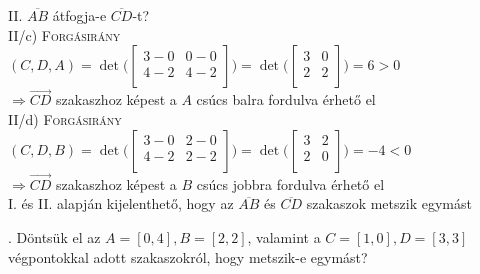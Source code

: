 \documentclass[12pt]{article}
\begin{document}
\noindent II. $\overline{AB}$ átfogja-e $\overline{CD}$-t? \\
II/c) {\scshape Forgásirány}$(C,D,A)=\det\Bigg(\begin{bmatrix}
3-0 & 0-0 \\
4-2 & 4-2 \\
\end{bmatrix}\Bigg)=\det\Bigg(\begin{bmatrix}
3  & 0 \\
2  & 2 \\
\end{bmatrix}\Bigg) = 6 > 0$ \\$\Rightarrow \overrightarrow{CD}$ szakaszhoz 
képest a $A$ csúcs balra fordulva érhető el  \\
II/d) {\scshape Forgásirány}$(C,D,B)=\det\Bigg(\begin{bmatrix}
3-0 & 2-0 \\
4-2 & 2-2 \\
\end{bmatrix}\Bigg)=\det\Bigg(\begin{bmatrix}
3  & 2 \\
2  & 0 \\
\end{bmatrix}\Bigg) = -4 < 0$ \\$\Rightarrow \overrightarrow{CD}$ szakaszhoz 
képest a $B$ csúcs jobbra fordulva érhető el  \\

I. és II. alapján kijelenthető, hogy az $\overline{AB}$ és $\overline{CD}$ 
szakaszok metszik egymást

. Döntsük el az $A=[0,4], B=[2,2]$, valamint a $C=[1,0], D=[3,3]$ 
végpontokkal adott szakaszokról, hogy metszik-e egymást?
\end{document}
